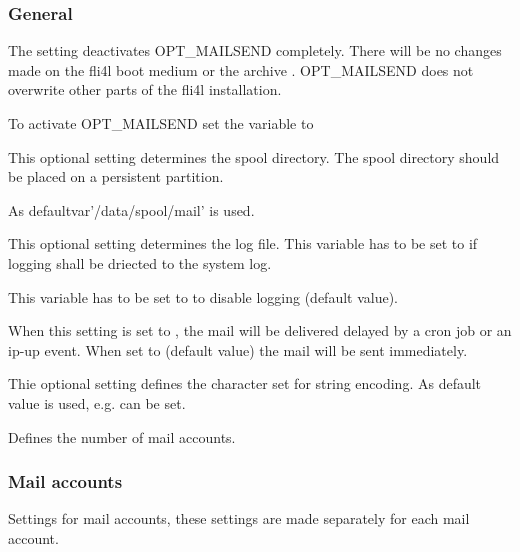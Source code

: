 \subsubsection {General}
\begin{description}


    The setting  deactivates OPT\_MAILSEND completely.
    There will be no changes made on the fli4l boot medium  
    or the archive . 
    OPT\_MAILSEND does not overwrite other parts of the fli4l installation.
    
    To activate OPT\_MAILSEND set the variable  to 

    
    This optional setting determines the spool directory.
    The spool directory should be placed on a persistent partition.
    
    As defaultvar{'/data/spool/mail'} is used.
     

    This optional setting determines the log file.
    This variable has to be set to  if logging shall be driected 
    to the system log. 
    
    This variable has to be set to  to disable logging (default value).

    
    When this setting is set to , the mail will be delivered delayed 
    by a cron job or an ip-up event.
    When set to  (default value) the mail will be sent immediately.
    
    
    Thie optional setting defines the character set for string encoding.
    As default value  is used, e.g.  can be set. 
                                
  
    Defines the number of mail accounts. 

\end{description}

\subsubsection {Mail accounts}
    Settings for mail accounts, these settings are made separately for each 
    mail account.
     

